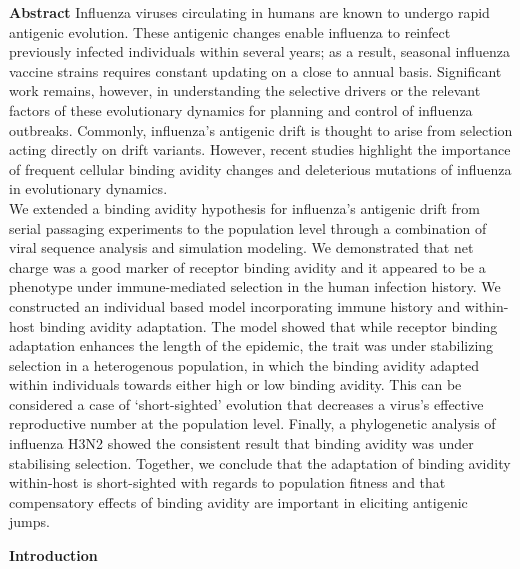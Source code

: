 \documentclass[12pt,a4paper]{article}
\begin{document}
{\bf Abstract}
Influenza viruses circulating in humans are known to undergo rapid antigenic evolution. These antigenic changes enable influenza to reinfect previously infected individuals within several years; as a result, seasonal influenza vaccine strains requires constant updating on a close to annual basis. Significant work remains, however, in understanding the selective drivers or the relevant factors of these evolutionary dynamics for planning and control of influenza outbreaks. Commonly, influenza’s antigenic drift is thought to arise from selection acting directly on drift variants. However, recent studies highlight the importance of frequent cellular binding avidity changes and deleterious mutations of influenza in evolutionary dynamics. \\
We extended a binding avidity hypothesis for influenza’s antigenic drift from serial passaging experiments to the population level through a combination of viral sequence analysis and simulation modeling. We demonstrated that net charge was a good marker of receptor binding avidity and it appeared to be a phenotype under immune-mediated selection in the human infection history. We constructed an individual based model incorporating immune history and within-host binding avidity adaptation. The model showed that while receptor binding adaptation enhances the length of the epidemic, the trait was under stabilizing selection in a heterogenous population, in which the binding avidity adapted within individuals towards either high or low binding avidity. This can be considered a case of ‘short-sighted’ evolution that decreases a virus’s effective reproductive number at the population level. Finally, a phylogenetic analysis of influenza H3N2 showed the consistent result that binding avidity was under stabilising selection. Together, we conclude that the adaptation of binding avidity within-host is short-sighted with regards to population fitness and that compensatory effects of binding avidity are important in eliciting antigenic jumps. 


{\bf Introduction}
\end{document}
